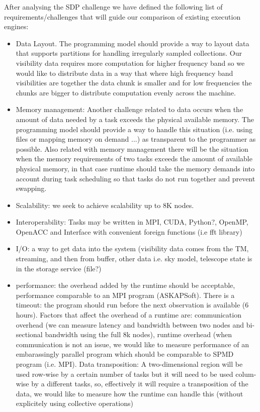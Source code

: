 After analysing the SDP challenge we have defined the following list of requirements/challenges that will guide our comparison of existing execution engines:
\begin{itemize}
\item Data Layout. The programming model should provide a way to layout data that supports partitions for handling irregularly sampled collections.
Our visibility data requires more computation for higher frequency band so we would like to distribute data in a way that where high frequency band
visibilities are together the data chunk is smaller and for low frequencies the chunks are bigger to distribute computation evenly across the machine.
\item Memory management: Another challenge related to data occurs when the amount of data needed by a task exceeds the physical available memory. 
The programming model should provide a way to handle this situation (i.e. using files or mapping memory on demand ...) as transparent to the programmer as possible. Also related with memory management there will be the situation when the memory requirements of two tasks exceeds the amount of available physical memory, in that case runtime should take the memory demands into account during task scheduling so that tasks do not run together and prevent swapping.  
\item Scalability: we seek to achieve scalability up to 8K nodes.
\item Interoperability: Tasks may be written in  MPI, CUDA, Python?, OpenMP, OpenACC and Interface with convenient foreign functions  (i.e fft library)
\item I/O: a way to get data into the system (visibility data comes from the TM, streaming, and then from buffer, other data i.e. sky model, telescope state is in the storage service (file?)
\item performance: the overhead added by the runtime should be acceptable, performance comparable to an MPI program (ASKAPSoft). There is a timeout: the program should run before the next observation is available (6 hours). Factors that affect the overhead of a runtime are: communication overhead (we can measure latency and bandwidth between two nodes and bi-sectional bandwidth using the full 8k nodes), runtime overhead (when communication is not an issue, we would like to measure performance of an embarassingly parallel program which should be comparable to SPMD program (i.e. MPI). Data transposition: A two-dimensional region will be used row-wise by a certain number of tasks but it will need to be used colum-wise by a different tasks, so, effectively it will require a transposition of the data, we would like to measure how the runtime can handle this (without explicitely using collective operations) 

\end{itemize}
